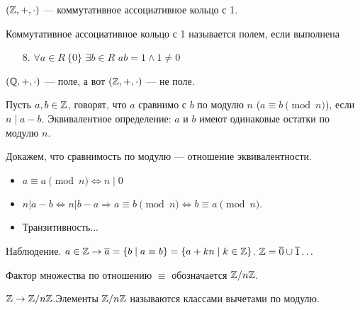 \slashn
\begin{example}
    $(\mathbb{Z}, +, \cdot)$ --- коммутативное ассоциативное кольцо с 1.
\end{example}
\begin{definition}
    Коммутативное ассоциативное кольцо с 1 называется полем, если выполнена 
    \begin{enumerate}
        \item[8.] $\forall a \in R \ \{0\}$  $\exists b \in R$  $ab = 1 \land 1 \neq 0$
    \end{enumerate}
\end{definition}
\begin{example}
    $(\mathbb{Q}, +, \cdot)$ --- поле, а вот  $(\mathbb{Z}, +, \cdot)$ --- не поле.
\end{example}

\begin{definition}
Пусть $a, b \in \mathbb{Z}$, говорят, что  $a$ сравнимо с  $b$ по модулю  $n$ ($a \equiv b \pmod{n}$), если $n \mid a - b$. Эквивалентное определение:  $a$ и  $b$ имеют одинаковые остатки по модулю  $n$.
\end{definition}
Докажем, что сравнимость по модулю --- отношение эквивалентности.
\begin{itemize}
    \item $a \equiv a \pmod{n} \iff n \mid 0$
    \item $n | a - b \iff n | b - a \Rightarrow a \equiv b \pmod{n} \iff b \equiv a \pmod{n}$.
    \item Транзитивность...
\end{itemize}
\slashn
Наблюдение.  $a \in \mathbb{Z} \rightarrow \overline{a} = \{b \mid a \equiv b\} = \{a + kn \mid k \in \mathbb{Z}\}$. $\mathbb{Z} = \overline{0} \cup \overline{1} \ldots$

\begin{definition}
    Фактор множества по отношению $\equiv$ обозначается  $\mathbb{Z} / n\mathbb{Z}$.
\end{definition}

$\mathbb{Z} \to \mathbb{Z} / n\mathbb{Z}$.Элементы $\mathbb{Z} / n\mathbb{Z}$ называются классами вычетами по модулю.

